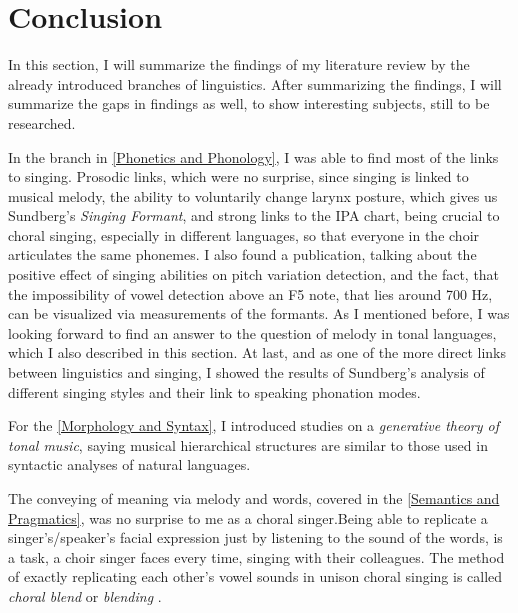 \chapter{Conclusion}
\label{chap:Conclusion}


In this section, I will summarize the findings of my literature review by the already introduced branches of linguistics. After summarizing the findings, I will summarize the gaps in findings as well, to show interesting subjects, still to be researched.




In the  branch in \autoref{Phonetics and Phonology}, I was able to find most of the links to singing. Prosodic links, which were no surprise, since singing is linked to musical melody, the ability to voluntarily change larynx posture, which gives us Sundberg's \textit{Singing Formant}, and strong links to the IPA chart, being crucial to choral singing, especially in different languages, so that everyone in the choir articulates the same phonemes. I also found a publication, talking about the positive effect of singing abilities on pitch variation detection, and the fact, that the impossibility of vowel detection above an F5 note, that lies around 700 Hz, can be visualized via measurements of the formants. As I mentioned before, I was looking forward to find an answer to the question of melody in tonal languages, which I also described in this section. At last, and as one of the more direct links between linguistics and singing, I showed the results of Sundberg's analysis of different singing styles and their link to speaking phonation modes.

For the  \autoref{Morphology and Syntax}, I introduced studies on a \textit{generative theory of tonal music}, saying musical hierarchical structures are similar to those used in syntactic analyses of natural languages.

The conveying of meaning via melody and words, covered in the  \autoref{Semantics and Pragmatics}, was no surprise to me as a choral singer.Being able to replicate a singer's/speaker's facial expression just by listening to the sound of the words, is a task, a choir singer faces every time, singing with their colleagues. The method of exactly replicating each other's vowel sounds in unison choral singing is called \textit{choral blend} or \textit{blending} \cite{goodwin1980acoustical}.


